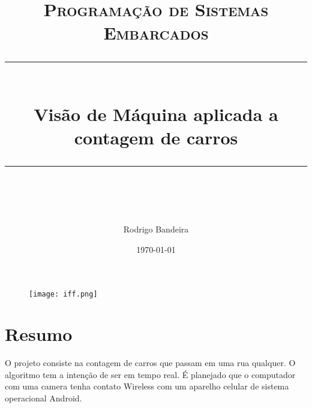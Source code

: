 \documentclass[14pt]{scrartcl} %
\title{	
	\normalfont\normalsize
	\textsc{Programação de Sistemas Embarcados}\\ %
	\vspace{25pt} %
	\rule{\linewidth}{0.5pt}\\ %
	\vspace{20pt} %
	{\huge Visão de Máquina aplicada a contagem de carros}\\ %
	\vspace{12pt} %
	\rule{\linewidth}{2pt}\\ %
	\vspace{12pt} %
}
\author{\LARGE Rodrigo Bandeira} %
\date{\normalsize\today} %
\begin{document}
\maketitle %


\begin{figure}[h] %
	\centering
	\texttt{[image: iff.png]} %
\end{figure}

\newpage

\section{Resumo}
	O projeto consiste na contagem de carros que passam em uma rua qualquer. O algoritmo tem a intenção de ser em tempo real. É planejado que o computador com uma camera tenha contato Wireless com um aparelho celular de sistema operacional Android. 
\end{document}
